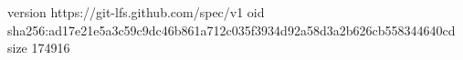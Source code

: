 version https://git-lfs.github.com/spec/v1
oid sha256:ad17e21e5a3c59c9dc46b861a712c035f3934d92a58d3a2b626cb558344640cd
size 174916
